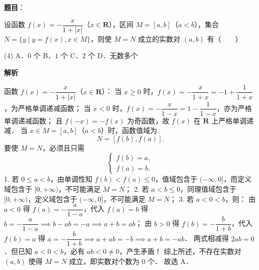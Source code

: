 \begin{answer}

\textbf{题目}：

设函数 $f(x) = -\dfrac{x}{1 + |x|}$（$x \in \mathbf{R}$），区间 $M = [a, b]$（$a < b$），集合 $N = \{y \mid y = f(x), x \in M\}$，则使 $M = N$ 成立的实数对 $(a, b)$ 有\mbox{（　　）}

\begin{gkopts}(4)
\task A．$0$ 个
\task B．$1$ 个
\task C．$2$ 个
\task D．无数多个
\end{gkopts}

\textbf{解析}

函数 $f(x) = -\dfrac{x}{1 + |x|}$（$x \in \mathbf{R}$）：
当 $x \geqslant 0$ 时，$f(x) = -\dfrac{x}{1 + x} = -1 + \dfrac{1}{1 + x}$，为严格单调递减函数；
当 $x < 0$ 时，$f(x) = -\dfrac{x}{1 - x} = 1 - \dfrac{1}{1 - x}$，亦为严格单调递减函数；
且 $f(-x) = -f(x)$ 为奇函数，故 $f(x)$ 在 $\mathbf{R}$ 上严格单调递减．
当 $x \in M = [a, b]$（$a < b$）时，函数值域为
\nopagebreak[4]
\[
N = [f(b), f(a)].
\]
要使 $M = N$，必须且只需
\nopagebreak[4]
\[
\begin{cases}
f(b) = a, \\
f(a) = b.
\end{cases}
\]
1. 若 $0 \leqslant a < b$，由单调性知 $f(b) < f(a) \leqslant 0$，值域包含于 $(-\infty, 0]$，而定义域包含于 $[0, +\infty)$，不可能满足 $M = N$；
2. 若 $a < b \leqslant 0$，同理值域包含于 $[0, +\infty)$，定义域包含于 $(-\infty, 0]$，不可能满足 $M = N$；
3. 若 $a < 0 < b$，则：
   由 $a < 0$ 得 $f(a) = -\dfrac{a}{1 - a}$，代入 $f(a) = b$ 得 $b = -\dfrac{a}{1 - a} \implies b - ab = -a \implies a + b = ab$；
   由 $b > 0$ 得 $f(b) = -\dfrac{b}{1 + b}$，代入 $f(b) = a$ 得 $a = -\dfrac{b}{1 + b} \implies a + ab = -b \implies a + b = -ab$．
   两式相减得 $2ab = 0$．但已知 $a < 0 < b$，必有 $ab < 0 \neq 0$，产生矛盾！
综上所述，不存在实数对 $(a, b)$ 使得 $M = N$ 成立，即实数对个数为 0 个．
故选 A．


\end{answer}
